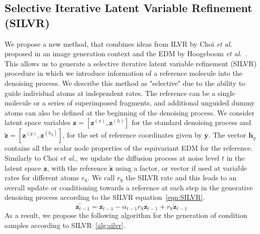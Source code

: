 \documentclass[journal=jacsat,manuscript=article]{achemso}
\begin{document}
\subsection{Selective Iterative Latent Variable Refinement (SILVR)}
\label{sec:silvr}
We propose a new method, that combines ideas from ILVR by Choi \textit{et al.}~\cite{choi2021ilvr} proposed in an image generation context and the EDM by Hoogeboom \textit{et al.}~\cite{hoogeboom2022equivariant}. This allows us to generate a selective iterative latent variable refinement (SILVR) procedure in which we introduce information of a reference molecule into the denoising process. We describe this method as "selective" due to the ability to guide individual atoms at independent rates. The reference can be a single molecule or a series of superimposed fragments, and additional unguided dummy atoms can also be defined at the beginning of the denoising process. We consider latent space variables $\mathbf{z}=[\mathbf{z}^{(x)},\mathbf{z}^{(h)}]$ for the standard denoising process and  $\mathbf{\tilde{z}} = [\mathbf{z}^{(y)},\mathbf{z}^{(h_y)}]$, for the set of reference coordinates given by $\mathbf{y}$. The vector $\mathbf{h}_y$ contains all the scalar node properties of the equivariant EDM for the reference. 
Similarly to Choi \textit{et al.}, we update the diffusion process at noise level $t$ in the latent space $\mathbf{z}$, with the reference $\mathbf{\tilde{z}}$ using a factor, or vector if used at variable rates for different atoms $r_{\mathrm{S}}$. We call $r_{\mathrm{S}}$ the SILVR rate and this leads to an overall update or conditioning towards a reference at each step in the generative denoising process according to the SILVR equation~\ref{eqn:SILVR}.
\begin{equation}
\mathbf{z}_{t-1}^{\prime} = \mathbf{z}_{t-1}-\alpha_{t-1}r_{\mathrm{S}}\mathbf{z}_{t-1}+r_{\mathrm{S}}\mathbf{\tilde{z}}_{t-1}
    \label{eqn:SILVR}
\end{equation}
As a result, we propose the following algorithm for the generation of condition samples according to SILVR~\ref{alg:silvr}.
\end{document}
